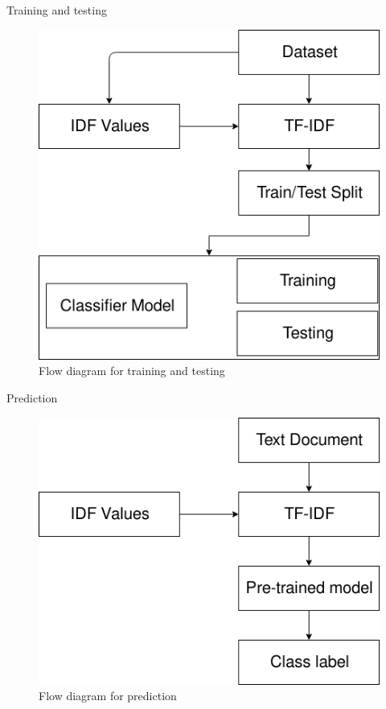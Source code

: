 \documentclass[12pt]{beamer}
\begin{document}
\begin{frame}{Training and testing}
    \begin{figure}[h]
        \includegraphics[scale=0.4]{images/training.png}
        \caption{Flow diagram for training and testing}
        \label{fig:training_testing}
    \end{figure}
\end{frame}

\begin{frame}{Prediction}
    \begin{figure}[h]
        \includegraphics[scale=0.4]{images/prediction.png}
        \caption{Flow diagram for prediction}
        \label{fig:prediction}
    \end{figure}
\end{frame}
\end{document}

